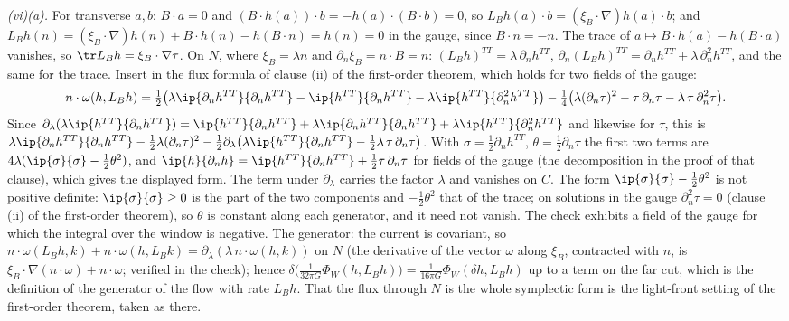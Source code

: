 \emph{(vi)(a).} For transverse $a, b$: $B \cdot a = 0$ and $(B \cdot h(a)) \cdot b = -h(a) \cdot (B \cdot b) = 0$, so $L_{B}h(a) \cdot b = (\xi_{B} \cdot \nabla)h(a) \cdot b$; and $L_{B}h(n) = (\xi_{B} \cdot \nabla)h(n) + B \cdot h(n) - h(B \cdot n) = h(n) = 0$ in the gauge, since $B \cdot n = -n$. The trace of $a \mapsto B \cdot h(a) - h(B \cdot a)$ vanishes, so $\tr L_{B}h = \xi_{B} \cdot \nabla\tau$. On $N$, where $\xi_{B} = \lambda n$ and $\partial_{n}\xi_{B} = n \cdot B = n$: $(L_{B}h)^{TT} = \lambda\,\partial_{n}h^{TT}$, $\partial_{n}(L_{B}h)^{TT} = \partial_{n}h^{TT} + \lambda\,\partial_{n}^{2}h^{TT}$, and the same for the trace. Insert in the flux formula of clause (ii) of the first-order theorem, which holds for two fields of the gauge:
\[
n \cdot \omega(h, L_{B}h) = \tfrac12\bigl(\lambda\ip{\partial_{n}h^{TT}}{\partial_{n}h^{TT}} - \ip{h^{TT}}{\partial_{n}h^{TT}} - \lambda\ip{h^{TT}}{\partial_{n}^{2}h^{TT}}\bigr) - \tfrac14\bigl(\lambda(\partial_{n}\tau)^{2} - \tau\,\partial_{n}\tau - \lambda\,\tau\,\partial_{n}^{2}\tau\bigr) .
\]
Since $\partial_{\lambda}(\lambda\ip{h^{TT}}{\partial_{n}h^{TT}}) = \ip{h^{TT}}{\partial_{n}h^{TT}} + \lambda\ip{\partial_{n}h^{TT}}{\partial_{n}h^{TT}} + \lambda\ip{h^{TT}}{\partial_{n}^{2}h^{TT}}$ and likewise for $\tau$, this is $\lambda\ip{\partial_{n}h^{TT}}{\partial_{n}h^{TT}} - \tfrac12\lambda(\partial_{n}\tau)^{2} - \tfrac12\partial_{\lambda}\bigl(\lambda\ip{h^{TT}}{\partial_{n}h^{TT}} - \tfrac12\lambda\,\tau\,\partial_{n}\tau\bigr)$. With $\sigma = \tfrac12\partial_{n}h^{TT}$, $\theta = \tfrac12\partial_{n}\tau$ the first two terms are $4\lambda(\ip{\sigma}{\sigma} - \tfrac12\theta^{2})$, and $\ip{h}{\partial_{n}h} = \ip{h^{TT}}{\partial_{n}h^{TT}} + \tfrac12\tau\,\partial_{n}\tau$ for fields of the gauge (the decomposition in the proof of that clause), which gives the displayed form. The term under $\partial_{\lambda}$ carries the factor $\lambda$ and vanishes on $C$. The form $\ip{\sigma}{\sigma} - \tfrac12\theta^{2}$ is not positive definite: $\ip{\sigma}{\sigma} \geq 0$ is the part of the two components and $-\tfrac12\theta^{2}$ that of the trace; on solutions in the gauge $\partial_{n}^{2}\tau = 0$ (clause (ii) of the first-order theorem), so $\theta$ is constant along each generator, and it need not vanish. The check exhibits a field of the gauge for which the integral over the window is negative. The generator: the current is covariant, so $n \cdot \omega(L_{B}h, k) + n \cdot \omega(h, L_{B}k) = \partial_{\lambda}(\lambda\,n \cdot \omega(h, k))$ on $N$ (the derivative of the vector $\omega$ along $\xi_{B}$, contracted with $n$, is $\xi_{B} \cdot \nabla(n \cdot \omega) + n \cdot \omega$; verified in the check); hence $\delta\bigl(\tfrac{1}{32\pi G}\Phi_{W}(h, L_{B}h)\bigr) = \tfrac{1}{16\pi G}\Phi_{W}(\delta h, L_{B}h)$ up to a term on the far cut, which is the definition of the generator of the flow with rate $L_{B}h$. That the flux through $N$ is the whole symplectic form is the light-front setting of the first-order theorem, taken as there.

